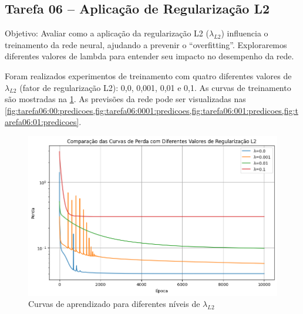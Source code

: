 \subsection{Tarefa 06 -- Aplicação de Regularização L2}

\begin{comandoquestao}
Objetivo: Avaliar como a aplicação da regularização L2 ($\lambda_{L2}$) 
influencia o 
treinamento da rede neural, ajudando a prevenir o ``overfitting''. Exploraremos 
diferentes valores de lambda para entender seu impacto no desempenho da rede.
\end{comandoquestao}

Foram realizados experimentos de treinamento com quatro diferentes valores de 
$\lambda_{L2}$ (fator de regularização L2): 0,0, 0,001, 0,01 e 0,1. As curvas 
de treinamento são mostradas na \cref{fig:tarefas06:curvas}. As previsões da 
rede pode ser visualizadas nas 
\cref{fig:tarefa06:00:predicoes,fig:tarefa06:0001:predicoes,fig:tarefa06:001:predicoes,fig:tarefa06:01:predicoes}.


\begin{figure}[tbh]
	\centering
	\caption{Curvas de aprendizado para diferentes níveis de $\lambda_{L2}$}
	\label{fig:tarefas06:curvas}
	\includegraphics[width=0.7\linewidth]{./0803_imgs/0703_tarefa06/png-241113-093042368-16803966117590063962.png}
\end{figure}



